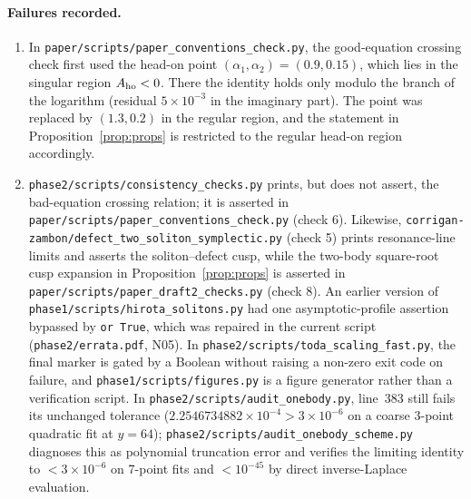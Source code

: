 \documentclass[11pt,a4paper]{article}
\newcommand{\scr}[1]{\nolinkurl{#1}}
\theoremstyle{remark}
\begin{document}
\paragraph{Failures recorded.}
\begin{enumerate}
\item In \scr{paper/scripts/paper_conventions_check.py}, the good-equation crossing check first used the head-on point $(\alpha_1,\alpha_2)=(0.9,0.15)$, which lies in the singular region $A_{\rm ho}<0$. There the identity holds only modulo the branch of the logarithm (residual $5\times10^{-3}$ in the imaginary part). The point was replaced by $(1.3,0.2)$ in the regular region, and the statement in Proposition~\ref{prop:props} is restricted to the regular head-on region accordingly.
\item \scr{phase2/scripts/consistency_checks.py} prints, but does not assert, the bad-equation crossing relation; it is asserted in \scr{paper/scripts/paper_conventions_check.py} (check 6). Likewise, \scr{corrigan-zambon/defect_two_soliton_symplectic.py} (check 5) prints resonance-line limits and asserts the soliton--defect cusp, while the two-body square-root cusp expansion in Proposition~\ref{prop:props} is asserted in \scr{paper/scripts/paper_draft2_checks.py} (check 8). An earlier version of \scr{phase1/scripts/hirota_solitons.py} had one asymptotic-profile assertion bypassed by \texttt{or True}, which was repaired in the current script (\scr{phase2/errata.pdf}, N05). In \scr{phase2/scripts/toda_scaling_fast.py}, the final marker is gated by a Boolean without raising a non-zero exit code on failure, and \scr{phase1/scripts/figures.py} is a figure generator rather than a verification script. In \scr{phase2/scripts/audit_onebody.py}, line~383 still fails its unchanged tolerance ($2.2546734882\times10^{-4}>3\times10^{-6}$ on a coarse 3-point quadratic fit at $y=64$); \scr{phase2/scripts/audit_onebody_scheme.py} diagnoses this as polynomial truncation error and verifies the limiting identity to $<3\times10^{-6}$ on 7-point fits and $<10^{-45}$ by direct inverse-Laplace evaluation.

\end{enumerate}
\end{document}
